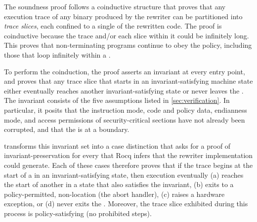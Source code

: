 

The soundness proof follows a coinductive structure that proves that any execution trace of any binary produced by the rewriter can be partitioned into \emph{trace slices}, each confined to a single \Block of the rewritten code.
The proof is coinductive because the trace and/or each slice within it could be infinitely long.
This proves that non-terminating programs continue to obey the policy, including those that loop infinitely within a \Block.

To perform the coinduction, the proof asserts an invariant at every \Block entry point, and proves that any trace slice that starts in an invariant-satisfying machine state either eventually reaches another invariant-satisfying state or never leaves the \Block.
The invariant consists of the five assumptions listed in \autoref{sec:verification}.
In particular, it posits that the instruction mode, code and policy data, endianness mode, and access permissions of security-critical sections have not already been corrupted, and that the \PC is at a \Block boundary.

\Picinae transforms this invariant set into a case distinction that asks for a proof of invariant-preservation for every \Block that Rocq infers that the rewriter implementation could generate.
Each of these cases therefore proves that if the trace begins at the start of a \Block in an invariant-satisfying state, then execution eventually
(a) reaches the start of another \Block in a state that also satisfies the invariant,
(b) exits to a policy-permitted, non-\Block location (\eg the abort handler),
(c) raises a hardware exception, or
(d) never exits the \Block.
Moreover, the trace slice exhibited during this process is policy-satisfying (no prohibited steps).

